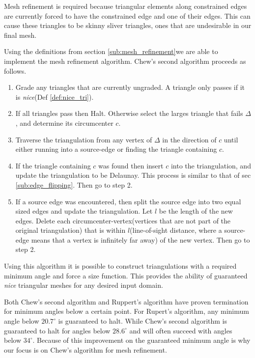\documentclass[../fem.tex]{subfile}
\begin{document}
Mesh refinement is required because triangular elements along constrained
edges are currently forced to have the constrained edge and one of their edges.
This can cause these triangles to be skinny sliver triangles, ones that are
undesirable in our final mesh.

Using the definitions from section \ref{sub:mesh_refinement}we are able to
implement the mesh refinement algorithm.  Chew's second algorithm proceeds as
follows.

\begin{enumerate}[label=\arabic*.]
  \item Grade any triangles that are currently ungraded. A triangle only passes
    if it is \textit{nice}(Def \ref{def:nice_tri}).
  \item If all triangles pass then Halt. Otherwise select the larges triangle
    that fails $\Delta$, and determine its circumcenter $c$.
  \item Traverse the triangulation from any vertex of $\Delta$ in the direction
    of $c$ until either running into a source-edge or finding the triangle
    containing $c$.
  \item If the triangle containing $c$ was found then insert $c$ into the
    triangulation, and update the triangulation to be Delaunay. This process is
    similar to that of sec \ref{sub:edge_flipping}. Then go to step 2.
  \item If a source edge was encountered, then split the source edge into two
    equal sized edges and update the triangulation. Let $l$ be the length of
    the new edges. Delete each circumcenter-vertex(vertices that are not part
    of the original triangulation) that is within $l$(line-of-sight distance,
    where a source-edge means that a vertex is infinitely far away) of the new
    vertex. Then go to step 2.
\end{enumerate}

Using this algorithm it is possible to construct triangulations with a required
minimum angle and force a size function. This provides the ability of
guaranteed \textit{nice} triangular meshes for any desired input domain.

Both Chew's second algorithm and Ruppert's algorithm have proven termination
for minimum angles below a certain point. For Rupert's algorithm, any minimum
angle below $20.7^{\circ}$ is guaranteed to halt. While Chew's second algorithm
is guaranteed to halt for angles below $28.6^{\circ}$ and will often succeed
with angles below $34^{\circ}$. Because of this improvement on the guaranteed
minimum angle is why our focus is on Chew's algorithm for mesh refinement.
\end{document}

